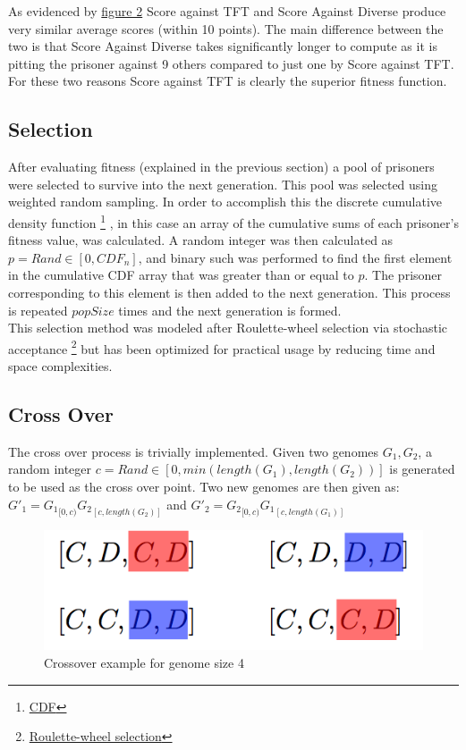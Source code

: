 \documentclass[12pt]{article}
\begin{document}
As evidenced by \hyperref[fig2]{figure 2} Score against TFT and Score Against Diverse
produce very similar average scores (within 10 points).  The main difference
between the two is that Score Against Diverse takes significantly longer to compute
as it is pitting the prisoner against 9 others compared to just one by Score against TFT.
For these two reasons Score against TFT is clearly the superior fitness function.

\subsection{Selection}

After evaluating fitness (explained in the previous section) a pool of
prisoners were selected to survive into the next generation.  This pool was
selected using weighted random sampling.  In order to accomplish this the
discrete cumulative density function
\footnote{\href{https://en.wikipedia.org/wiki/Cumulative distribution function}{CDF}}
, in this case an array of the cumulative sums of each prisoner's fitness value,
was calculated.  A random integer was then calculated as $p = Rand \in [0, CDF_n]$,
and binary such was performed to find the first element in the cumulative CDF array that
was greater than or equal to $p$.  The prisoner corresponding to this element
is then added to the next generation.  This process is repeated $popSize$ times
and the next generation is formed. \\

This selection method was modeled after Roulette-wheel selection via stochastic acceptance
\footnote{\href{http://arxiv.org/pdf/1109.3627.pdf}{Roulette-wheel selection}}
but has been optimized for practical usage by reducing time and space complexities.

\subsection{Cross Over}

The cross over process is trivially implemented.  Given two genomes $G_1, G_2$,
a random integer $c = Rand \in [0, min(length(G_1), length(G_2))]$ is generated
to be used as the cross over point.  Two new genomes are then given as:\\

$G'_1 = {G_1}_{[0,c)}{G_2}_{[c, length(G_2)]}$ and
$G'_2 = {G_2}_{[0, c)}{G_1}_{[c, length(G_1)]}$ \\

\begin{figure}[h]
    \caption{Crossover example for genome size 4}
    \centering
    \includegraphics[scale=0.5]{figures/crossover-example.png}
\end{figure}
\end{document}
